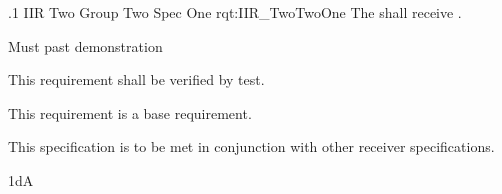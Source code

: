 \ONERQMTV
{\RqtNumberBase.1}
{IIR Two Group Two Spec One}
{rqt:IIR_TwoTwoOne}
{The \ThisSys{} shall receive \TBD.}
{
	\item [Phase 1] Must past demonstration
}
{This requirement shall be verified by test.}
{
	\item [N/A] This requirement is a base requirement.
}
{
	\item This specification is to be met in conjunction with other receiver specifications.
}
{1dA}
